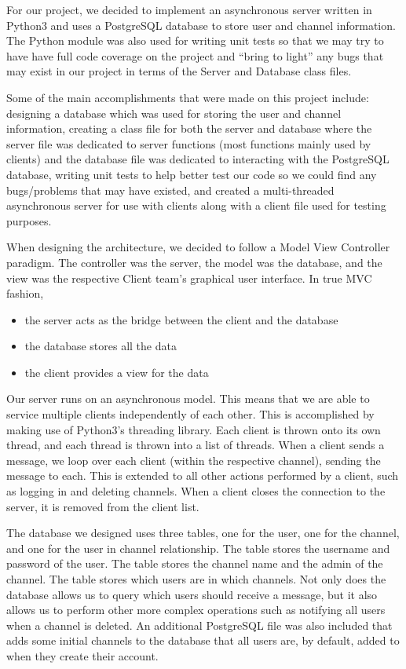 \documentclass[oneside,12pt]{scrbook}
\begin{document}

For our project, we decided to implement an asynchronous server written in Python3 and uses a PostgreSQL database to store user and channel information. The Python module  was also used for writing unit tests so that we may try to have have full code coverage on the project and ``bring to light'' any bugs that may exist in our project in terms of the Server and Database class files.

Some of the main accomplishments that were made on this project include: designing a database which was used for storing the user and channel information, creating a class file for both the server and database where the server file was dedicated to server functions (most functions mainly used by clients) and the database file was dedicated to interacting with the PostgreSQL database, writing unit tests to help better test our code so we could find any bugs/problems that may have existed, and created a multi-threaded asynchronous server for use with clients along with a client file used for testing purposes.

When designing the architecture, we decided to follow a Model View Controller paradigm. The controller was the server, the model was the database, and the view was the respective Client team’s graphical user interface. In true MVC fashion,

\begin{itemize}
    \item the server acts as the bridge between the client and the database
    \item the database stores all the data
    \item the client provides a view for the data
\end{itemize}

Our server runs on an asynchronous model. This means that we are able to service multiple clients independently of each other. This is accomplished by making use of Python3's threading library. Each client is thrown onto its own thread, and each thread is thrown into a list of threads. When a client sends a message, we loop over each client (within the respective channel), sending the message to each. This is extended to all other actions performed by a client, such as logging in and deleting channels. When a client closes the connection to the server, it is removed from the client list.

The database we designed uses three tables, one for the user, one for the channel, and one for the user in channel relationship. The  table stores the username and password of the user. The  table stores the channel name and the admin of the channel. The  table stores which users are in which channels. Not only does the database allows us to query which users should receive a message, but it also allows us to perform other more complex operations such as notifying all users when a channel is deleted. An additional PostgreSQL file was also included that adds some initial channels to the database that all users are, by default, added to when they create their account.
\end{document}
